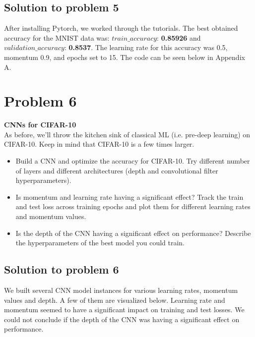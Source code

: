 \documentclass[12pt]{article}%
\begin{document}
\subsection{Solution to problem 5}

After installing Pytorch, we worked through the tutorials. The best obtained accuracy for the MNIST data was: \emph{$train\_accuracy$}: \textbf{0.85926} and \emph{$validation\_accuracy$}: \textbf{0.8537}. The learning rate for this accuracy was 0.5, momentum 0.9, and epochs set to 15. The code can be seen below in Appendix A.\\




\section{Problem 6}

\textbf{CNNs for CIFAR-10}\\

As before, we'll throw the kitchen sink of classical ML (i.e. pre-deep learning) on CIFAR-10. Keep in mind that CIFAR-10 is a few times larger.

\begin{itemize}
    \item Build a CNN and optimize the accuracy for CIFAR-10. Try different number of layers and different architectures (depth and convolutional filter hyperparameters).
    \item Is momentum and learning rate having a significant effect? Track the train and test loss across training epochs and plot them for different learning rates and momentum values.
    \item  Is the depth of the CNN having a significant effect on performance? Describe the hyperparameters of the best model you could train.
\end{itemize}

\subsection{Solution to problem 6}

We built several CNN model instances for various learning rates, momentum values and depth. A few of them are visualized below. Learning rate and momentum seemed to have a significant impact on training and test losses. We could not conclude if the depth of the CNN was having a significant effect on performance.\\
\end{document}
